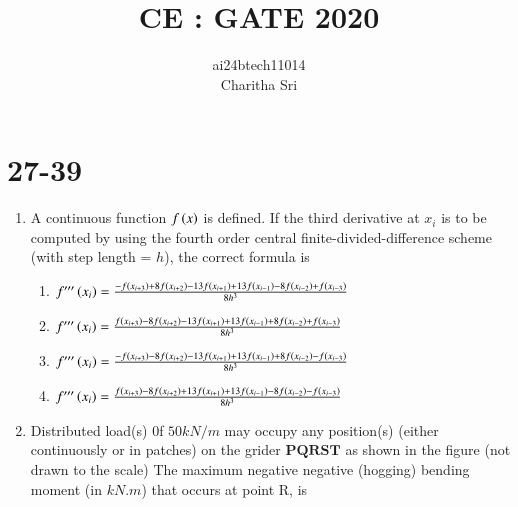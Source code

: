 \documentclass[journal,12pt,onecolumn]{IEEEtran}
\newcommand{\tripleprime}{{\prime\prime\prime}}
\theoremstyle{remark}
\begin{document}

\vspace{3cm}

\title{CE : GATE 2020}
\author{ai24btech11014 \\ Charitha Sri}

\maketitle
\bigskip       
\renewcommand{\thefigure}{\theenumi}
\renewcommand{\thetable}{\theenumi}

\section{27-39}
\begin{enumerate}
\item A continuous function $f\left(x\right)$ is defined. If the third derivative at $x_{i}$ is to be computed by using the fourth order central finite-divided-difference scheme (with step length = $h$), the correct formula is 
\begin{enumerate}
    \item $f^{\tripleprime} \brak{x_{i}} = \frac{-f\brak{x_{i+3}} + 8 f\brak{x_{i+ 2}} -13 f \brak{x_{i+ 1}} + 13f\brak{x_{i-1}} - 8 f\brak{x_{i-2}} + f\brak{x_{i - 3}}}{8 h ^{3}}$
\\
     \item $f^{\tripleprime} \brak{x_{i}} = \frac{f\brak{x_{i+3}} - 8 f\brak{x_{i+ 2}} -13 f \brak{x_{i+ 1}} + 13f\brak{x_{i-1}} + 8 f\brak{x_{i-2}} + f\brak{x_{i - 3}}}{8 h ^{3}}$
\\
     \item $f^{\tripleprime} \brak{x_{i}} = \frac{-f\brak{x_{i+3}} - 8 f\brak{x_{i+ 2}} -13 f \brak{x_{i+ 1}} + 13f\brak{x_{i-1}} + 8 f\brak{x_{i-2}} - f\brak{x_{i - 3}}}{8 h ^{3}}$
\\
     \item $f^{\tripleprime} \brak{x_{i}} = \frac{f\brak{x_{i+3}} - 8 f\brak{x_{i+ 2}} + 13 f \brak{x_{i+ 1}} + 13f\brak{x_{i-1}} - 8 f\brak{x_{i-2}} - f\brak{x_{i - 3}}}{8 h ^{3}}$  
\end{enumerate}

\item Distributed load(s) 0f $ 50 k N/m $ may occupy any position(s) (either continuously or in patches) on the grider $\textbf{PQRST}$ as shown in the figure (not drawn to the scale)
The maximum negative negative (hogging) bending moment (in $k N. m$) that occurs at point R, is 
\begin{center}


\end{center}
\end{enumerate}
\end{document}
